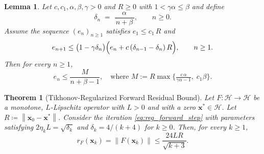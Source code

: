\documentclass[10pt,a4paper]{amsart}
\newtheorem{theorem}{Theorem}
\newtheorem{lemma}{Lemma}
\newcommand{\norm}[1]{\left\| #1 \right\|}
\newcommand{\vect}[1]{\mathbf{#1}}
\begin{document}
\begin{lemma}\label{lem:recurrence}
Let \(c,c_1,\alpha,\beta,\gamma>0\) and \(R\ge0\) with $1 < \gamma \alpha \le \beta$ and define
\[
   \delta_n \;=\; \frac{\alpha}{\,n+\beta\,}, 
   \qquad n\ge0.
\]
Assume the sequence \((e_n)_{n\ge 1}\) satisfies $e_1 \le c_1\,R$ and
\begin{equation} \label{eq:rec}
   e_{n+1}  \le \bigl(1-\gamma\delta_n\bigr)
         \Bigl(e_{n}+c\,(\delta_{n-1}-\delta_n)\,R\Bigr),
         \qquad n\ge 1. 
\end{equation}
Then for every \(n\ge 1\),
\[
   e_n \le \frac{M}{n + \beta - 1}, \quad \text{where }
        M := R\max\!\bigl\{
            \tfrac{c\,\alpha}{\gamma\alpha-1},
            \;c_1\beta
         \bigr\}.
\]
\end{lemma}

\begin{theorem}[Tikhonov-Regularized Forward Residual Bound]\label{thm:reg_forward}
Let \(F:\mathcal H\to\mathcal H\) be a monotone, \(L\)-Lipschitz operator with
\(L>0\) and with a zero \(\vect{x}^*\in\mathcal H\). Let
\(R\coloneqq\norm{\vect{x}_0-\vect{x}^*}\). Consider the iteration
\eqref{eq:reg_forward_step} with parameters satisfying
\(2\eta_kL=\sqrt{\delta_k}\) and \(\delta_k=4/(k+4)\) for \(k\ge0\). Then, for
every \(k\ge1\),
\[
    r_F(\vect{x}_k)
    =
    \norm{F(\vect{x}_k)}
    \le
    \frac{24LR}{\sqrt{k+3}}.
\]
\end{theorem}
\end{document}
